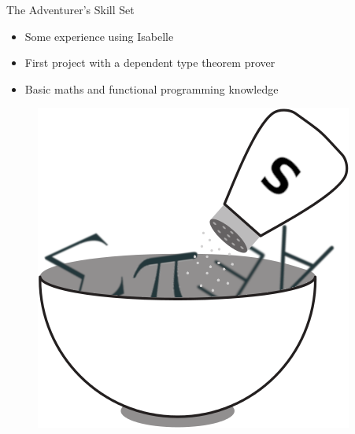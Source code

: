 \documentclass{beamer}
\begin{document}
\begin{frame}{The Adventurer's Skill Set}
\pause
\begin{itemize}[<+->]
\item Some experience using Isabelle
\item First project with a dependent type theorem prover
\item Basic maths and functional programming knowledge
\end{itemize}
\end{frame}
\begin{frame}
\begin{figure}
    \includegraphics[height=0.8\textheight]{img/salt_shaker.png}
\end{figure}
\end{frame}
\end{document}
